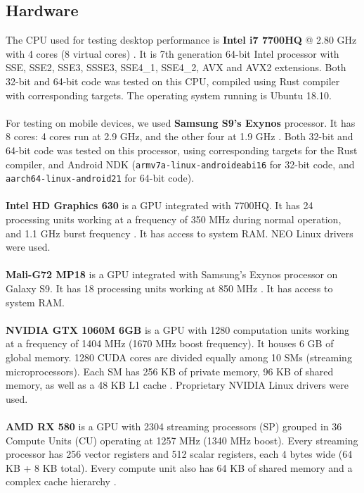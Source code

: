 \subsection{Hardware}
The CPU used for testing desktop performance is \textbf{Intel i7 7700HQ} @ 2.80 GHz with 4 cores (8 virtual cores) \cite{intel7700hq}. It is 7th generation 64-bit Intel processor with SSE, SSE2, SSE3, SSSE3, SSE4\_1, SSE4\_2, AVX and AVX2 extensions. Both 32-bit and 64-bit code was tested on this CPU, compiled using Rust compiler with corresponding targets. The operating system running is Ubuntu 18.10.\\
\\
For testing on mobile devices, we used \textbf{Samsung S9's Exynos} processor. It has 8 cores: 4 cores run at 2.9 GHz, and the other four at 1.9 GHz \cite{exynos9810}. Both 32-bit and 64-bit code was tested on this processor, using corresponding targets for the Rust compiler, and Android NDK (\texttt{armv7a-linux-androideabi16} for 32-bit code, and \texttt{aarch64-linux-android21} for 64-bit code).\\
\\
\textbf{Intel HD Graphics 630} is a GPU integrated with 7700HQ. It has 24 processing units working at a frequency of 350 MHz during normal operation, and 1.1 GHz burst frequency \cite{intelhd630}. It has access to system RAM. NEO Linux drivers were used.\\
\\
\textbf{Mali-G72 MP18} is a GPU integrated with Samsung's Exynos processor on Galaxy S9. It has 18 processing units working at 850 MHz \cite{mali}. It has access to system RAM.\\
\\
\textbf{NVIDIA GTX 1060M 6GB} is a GPU with 1280 computation units working at a frequency of 1404 MHz (1670 MHz boost frequency). It houses 6 GB of global memory. 1280 CUDA cores are divided equally among 10 SMs (streaming microprocessors). Each SM has 256 KB of private memory, 96 KB of shared memory, as well as a 48 KB L1 cache \cite{nvidia1060}. Proprietary NVIDIA Linux drivers were used.\\
\\
\textbf{AMD RX 580} is a GPU with 2304 streaming processors (SP) grouped in 36 Compute Units (CU) operating at 1257 MHz (1340 MHz boost). Every streaming processor has 256 vector registers and 512 scalar registers, each 4 bytes wide (64 KB + 8 KB total). Every compute unit also has 64 KB of shared memory and a complex cache hierarchy \cite{amdrx580}.\\

